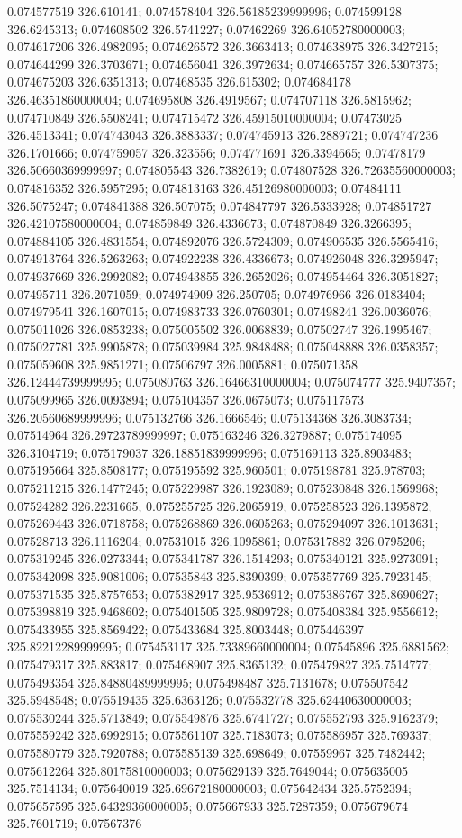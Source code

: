 0.074577519 326.610141; 0.074578404 326.56185239999996; 0.074599128 326.6245313; 0.074608502 326.5741227; 0.07462269 326.64052780000003; 0.074617206 326.4982095; 0.074626572 326.3663413; 0.074638975 326.3427215; 0.074644299 326.3703671; 0.074656041 326.3972634; 0.074665757 326.5307375; 0.074675203 326.6351313; 0.07468535 326.615302; 0.074684178 326.46351860000004; 0.074695808 326.4919567; 0.074707118 326.5815962; 0.074710849 326.5508241; 0.074715472 326.45915010000004; 0.07473025 326.4513341; 0.074743043 326.3883337; 0.074745913 326.2889721; 0.074747236 326.1701666; 0.074759057 326.323556; 0.074771691 326.3394665; 0.07478179 326.50660369999997; 0.074805543 326.7382619; 0.074807528 326.72635560000003; 0.074816352 326.5957295; 0.074813163 326.45126980000003; 0.07484111 326.5075247; 0.074841388 326.507075; 0.074847797 326.5333928; 0.074851727 326.42107580000004; 0.074859849 326.4336673; 0.074870849 326.3266395; 0.074884105 326.4831554; 0.074892076 326.5724309; 0.074906535 326.5565416; 0.074913764 326.5263263; 0.074922238 326.4336673; 0.074926048 326.3295947; 0.074937669 326.2992082; 0.074943855 326.2652026; 0.074954464 326.3051827; 0.07495711 326.2071059; 0.074974909 326.250705; 0.074976966 326.0183404; 0.074979541 326.1607015; 0.074983733 326.0760301; 0.07498241 326.0036076; 0.075011026 326.0853238; 0.075005502 326.0068839; 0.07502747 326.1995467; 0.075027781 325.9905878; 0.075039984 325.9848488; 0.075048888 326.0358357; 0.075059608 325.9851271; 0.07506797 326.0005881; 0.075071358 326.12444739999995; 0.075080763 326.16466310000004; 0.075074777 325.9407357; 0.075099965 326.0093894; 0.075104357 326.0675073; 0.075117573 326.20560689999996; 0.075132766 326.1666546; 0.075134368 326.3083734; 0.07514964 326.29723789999997; 0.075163246 326.3279887; 0.075174095 326.3104719; 0.075179037 326.18851839999996; 0.075169113 325.8903483; 0.075195664 325.8508177; 0.075195592 325.960501; 0.075198781 325.978703; 0.075211215 326.1477245; 0.075229987 326.1923089; 0.075230848 326.1569968; 0.07524282 326.2231665; 0.075255725 326.2065919; 0.075258523 326.1395872; 0.075269443 326.0718758; 0.075268869 326.0605263; 0.075294097 326.1013631; 0.07528713 326.1116204; 0.07531015 326.1095861; 0.075317882 326.0795206; 0.075319245 326.0273344; 0.075341787 326.1514293; 0.075340121 325.9273091; 0.075342098 325.9081006; 0.07535843 325.8390399; 0.075357769 325.7923145; 0.075371535 325.8757653; 0.075382917 325.9536912; 0.075386767 325.8690627; 0.075398819 325.9468602; 0.075401505 325.9809728; 0.075408384 325.9556612; 0.075433955 325.8569422; 0.075433684 325.8003448; 0.075446397 325.82212289999995; 0.075453117 325.73389660000004; 0.07545896 325.6881562; 0.075479317 325.883817; 0.075468907 325.8365132; 0.075479827 325.7514777; 0.075493354 325.84880489999995; 0.075498487 325.7131678; 0.075507542 325.5948548; 0.075519435 325.6363126; 0.075532778 325.62440630000003; 0.075530244 325.5713849; 0.075549876 325.6741727; 0.075552793 325.9162379; 0.075559242 325.6992915; 0.075561107 325.7183073; 0.075586957 325.769337; 0.075580779 325.7920788; 0.075585139 325.698649; 0.07559967 325.7482442; 0.075612264 325.80175810000003; 0.075629139 325.7649044; 0.075635005 325.7514134; 0.075640019 325.69672180000003; 0.075642434 325.5752394; 0.075657595 325.64329360000005; 0.075667933 325.7287359; 0.075679674 325.7601719; 0.07567376 